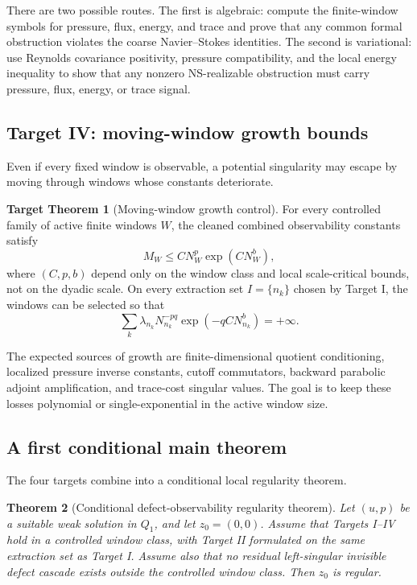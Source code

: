 \documentclass[11pt]{article}
\numberwithin{equation}{section}
\theoremstyle{plain}
\newtheorem{theorem}{Theorem}[section]
\theoremstyle{definition}
\newtheorem{target}[theorem]{Target Theorem}
\theoremstyle{remark}
\begin{document}
There are two possible routes.  The first is algebraic: compute the finite-window
symbols for pressure, flux, energy, and trace and prove that any common formal
obstruction violates the coarse Navier--Stokes identities.  The second is
variational: use Reynolds covariance positivity, pressure compatibility, and the
local energy inequality to show that any nonzero NS-realizable obstruction must
carry pressure, flux, energy, or trace signal.

\subsection{Target IV: moving-window growth bounds}

Even if every fixed window is observable, a potential singularity may escape by
moving through windows whose constants deteriorate.

\begin{target}[Moving-window growth control]
\label{thm:target-moving-window-growth}
For every controlled family of active finite windows \(W\), the cleaned combined
observability constants satisfy
\[
        M_W\le C N_W^p\exp(CN_W^b),
\]
where \((C,p,b)\) depend only on the window class and local scale-critical
bounds, not on the dyadic scale.  On every extraction set \(I=\{n_k\}\) chosen
by Target I, the windows can be selected so that
\[
        \sum_k \lambda_{n_k}N_{n_k}^{-pq}\exp(-qC N_{n_k}^b)=+\infty.
\]
\end{target}

The expected sources of growth are finite-dimensional quotient conditioning,
localized pressure inverse constants, cutoff commutators, backward parabolic
adjoint amplification, and trace-cost singular values.  The goal is to keep
these losses polynomial or single-exponential in the active window size.

\subsection{A first conditional main theorem}

The four targets combine into a conditional local regularity theorem.

\begin{theorem}[Conditional defect-observability regularity theorem]
\label{thm:conditional-defect-observability-regularity}
Let \((u,p)\) be a suitable weak solution in \(Q_1\), and let \(z_0=(0,0)\).
Assume that Targets I--IV hold in a controlled window class, with Target II
formulated on the same extraction set as Target I.  Assume also that no residual
left-singular invisible defect cascade exists outside the controlled window
class.  Then \(z_0\) is regular.
\end{theorem}
\end{document}
